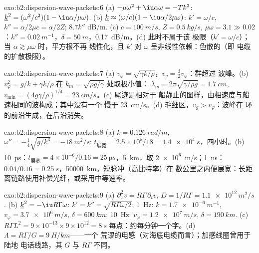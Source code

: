 \begin{solution}{exo:b2:dispersion-wave-packets:6}
(a) $-\mu\omega^2 + \iu\alpha\omega = -Tk^2$: $\underline k^2 = (\omega^2/c^2)(1 - \iu\alpha/\mu\omega)$.
(b) $\underline k \approx (\omega/c)(1 - \iu\alpha/2\mu\omega)$: $k' = \omega/c$, $k'' = \alpha/2\mu c =
\alpha/2Z$; $8.7k''$ dB/m. (c) $c = \qty{100}{m/s}$, $Z = \qty{0.5}{kg/s}$, $\mu\omega = 3.1 \gg
0.02$：$k'' = \qty{0.02}{m^{-1}}$，$\delta = \qty{50}{m}$，\qty{0.17}{dB/m}。(d) 此时不属于该
极限（$k' = \omega/c$）；当 $\alpha \gtrsim \mu\omega$ 时，平方根不再
线性化，且 $k'$ 对 $\omega$ 呈非线性依赖：色散的（即
电缆的扩散极限）。
\end{solution}

\begin{solution}{exo:b2:dispersion-wave-packets:7}
(a) $v_\varphi = \sqrt{\gamma k/\rho}$，$v_g = \tfrac32v_\varphi$：群超过
波峰。(b) $v_\varphi^2 = g/k + \gamma k/\rho$ 在 $k_m = \sqrt{\rho g/\gamma}$ 处取极小值：
$\lambda_m = 2\pi\sqrt{\gamma/\rho g} = \qty{1.7}{cm}$, $v_{\min} = (4g\gamma/\rho)^{1/4} =
\qty{23}{cm/s}$。(c) 尾迹是相对于
船静止的图样，由相速度与船速相同的波构成；其中没有一个
慢于 \qty{23}{cm/s}。(d) 毛细区，$v_g > v_\varphi$：波峰在
环的前沿生成，在后沿消失。
\end{solution}

\begin{solution}{exo:b2:dispersion-wave-packets:8}
(a) $k = \qty{0.126}{rad/m}$, $\omega'' = -\tfrac14\sqrt{g/k^3} = \qty{-18}{m^2/s}$: $t_{\text{展宽}}
= 2.5 \times 10^5/18 = \qty{1.4e4}{s}$，四小时。(b) \qty{10}{ps}：$t_{\text{展宽}} =
4 \times 10^{-6}/0.16 = \qty{25}{\micro s}$，\qty{5}{km}，取 \qty{2e8}{m/s}；\qty{1}{ns}：$0.04/0.16 =
\qty{0.25}{s}$，\qty{50000}{km}。短脉冲（高比特率）在
数公里之内便展宽：长距离链路使用补偿光纤，或采用中等速率。
\end{solution}

\begin{solution}{exo:b2:dispersion-wave-packets:9}
(a) $\partial_x^2v = R\Gamma\,\partial_tv$, $D = 1/R\Gamma = \qty{1.1e12}{m^2/s}$. (b) $\underline k^2
= -\iu R\Gamma\omega$: $k' = k'' = \sqrt{R\Gamma\omega/2}$; \qty{1}{Hz}: $k = \qty{1.7e-6}{m^{-1}}$,
$v_\varphi = \qty{3.7e6}{m/s}$, $\delta = \qty{600}{km}$; \qty{10}{Hz}: $v_\varphi = \qty{1.2e7}{m/s}$,
$\delta = \qty{190}{km}$. (c) $R\Gamma L^2 = 9 \times 10^{-13} \times 9 \times 10^{12} = \qty{8}{s}$
每点：约每分钟一个字。(d) $\Lambda = R\Gamma/G = \qty{9}{H/km}$——一个
荒谬的电感（对海底电缆而言）；加感线圈曾用于陆地
电话线路，其 $G$ 与 $R\Gamma$ 不同。
\end{solution}

